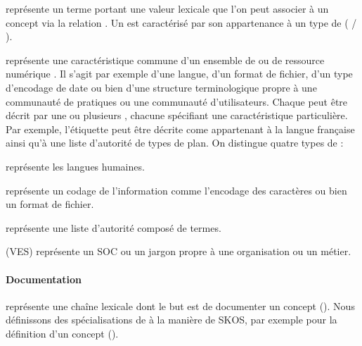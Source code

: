	 représente un terme portant une valeur lexicale que l'on peut associer à un concept via la relation .
	Un  est caractérisé par son appartenance à un type de  ( / ).

	 représente une caractéristique commune d'un ensemble de  ou de ressource numérique . 
	Il s'agit par exemple d'une langue, d'un format de fichier, d'un type d'encodage de date ou bien d'une structure terminologique propre à une communauté de pratiques ou une communauté d'utilisateurs.
	Chaque  peut être décrit par une ou plusieurs , chacune spécifiant une caractéristique particulière.
	Par exemple, l'étiquette  peut être décrite come appartenant à la langue française ainsi qu'à une liste d'autorité de types de plan.
	On distingue quatre types de  : 
	\begin{liste}
		\item {} représente les langues humaines.
		\item {} représente un codage de l'information comme l'encodage des caractères ou bien un format de fichier. 
		\item {} représente une liste d'autorité composé de termes. 
		\item {} (VES) représente un SOC ou un jargon propre à une organisation ou un métier.\\
	\end{liste}



\paragraph{Documentation}
	 représente une chaîne lexicale dont le but est de documenter un concept (). 
	Nous définissons des spécialisations de  à la manière de SKOS, par exemple pour la définition d'un concept (). 

